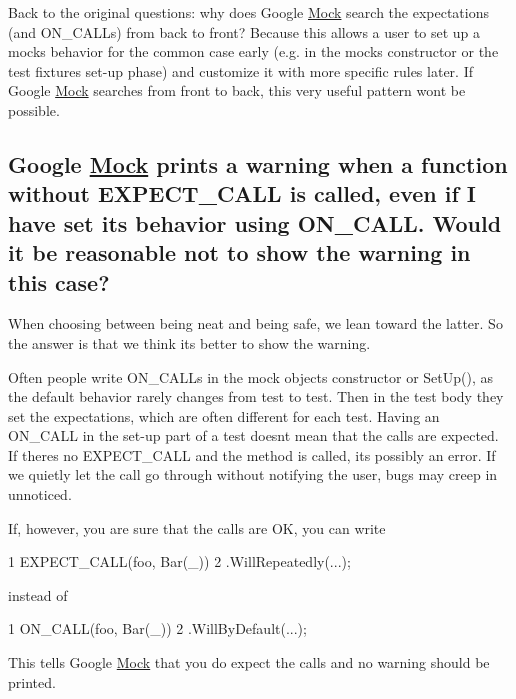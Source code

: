 Back to the original questions\+: why does Google \hyperlink{classMock}{Mock} search the expectations (and {\ttfamily O\+N\+\_\+\+C\+A\+LL}s) from back to front? Because this allows a user to set up a mock\textquotesingle{}s behavior for the common case early (e.\+g. in the mock\textquotesingle{}s constructor or the test fixture\textquotesingle{}s set-\/up phase) and customize it with more specific rules later. If Google \hyperlink{classMock}{Mock} searches from front to back, this very useful pattern won\textquotesingle{}t be possible.

\subsection*{Google \hyperlink{classMock}{Mock} prints a warning when a function without E\+X\+P\+E\+C\+T\+\_\+\+C\+A\+LL is called, even if I have set its behavior using O\+N\+\_\+\+C\+A\+LL. Would it be reasonable not to show the warning in this case?}

When choosing between being neat and being safe, we lean toward the latter. So the answer is that we think it\textquotesingle{}s better to show the warning.

Often people write {\ttfamily O\+N\+\_\+\+C\+A\+LL}s in the mock object\textquotesingle{}s constructor or {\ttfamily Set\+Up()}, as the default behavior rarely changes from test to test. Then in the test body they set the expectations, which are often different for each test. Having an {\ttfamily O\+N\+\_\+\+C\+A\+LL} in the set-\/up part of a test doesn\textquotesingle{}t mean that the calls are expected. If there\textquotesingle{}s no {\ttfamily E\+X\+P\+E\+C\+T\+\_\+\+C\+A\+LL} and the method is called, it\textquotesingle{}s possibly an error. If we quietly let the call go through without notifying the user, bugs may creep in unnoticed.

If, however, you are sure that the calls are OK, you can write


\begin{DoxyCode}
1 EXPECT\_CALL(foo, Bar(\_))
2     .WillRepeatedly(...);
\end{DoxyCode}


instead of


\begin{DoxyCode}
1 ON\_CALL(foo, Bar(\_))
2     .WillByDefault(...);
\end{DoxyCode}


This tells Google \hyperlink{classMock}{Mock} that you do expect the calls and no warning should be printed.

